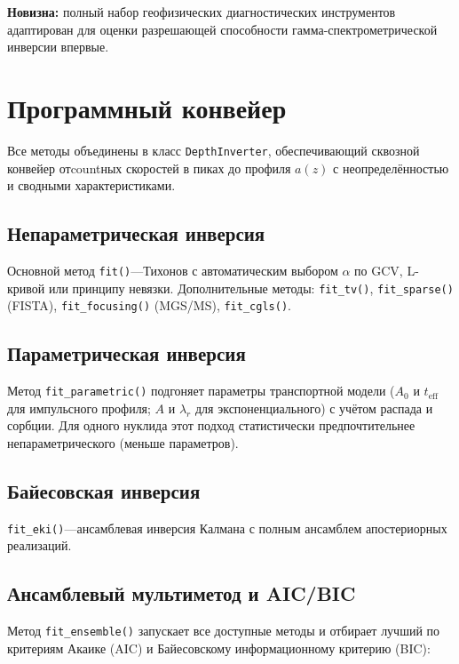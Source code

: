 \documentclass[12pt,a4paper]{article}
\begin{document}
\textbf{Новизна:} полный набор геофизических диагностических
инструментов адаптирован для оценки разрешающей способности
гамма-спектрометрической инверсии впервые.



\section{Программный конвейер}
\label{sec:pipeline}

Все методы объединены в класс \texttt{DepthInverter}, обеспечивающий
сквозной конвейер отcountных скоростей в пиках до профиля $a(z)$
с неопределённостью и сводными характеристиками.

\subsection{Непараметрическая инверсия}

Основной метод \texttt{fit()}---Тихонов с автоматическим выбором $\alpha$
по GCV, L-кривой или принципу невязки.
Дополнительные методы: \texttt{fit\_tv()}, \texttt{fit\_sparse()} (FISTA),
\texttt{fit\_focusing()} (MGS/MS), \texttt{fit\_cgls()}.

\subsection{Параметрическая инверсия}

Метод \texttt{fit\_parametric()} подгоняет параметры транспортной модели
($A_0$ и $t_{\mathrm{eff}}$ для импульсного профиля;
$A$ и $\lambda_r$ для экспоненциального) с учётом
распада и сорбции.
Для одного нуклида этот подход статистически предпочтительнее
непараметрического (меньше параметров).

\subsection{Байесовская инверсия}

\texttt{fit\_eki()}---ансамблевая инверсия Калмана с
полным ансамблем апостериорных реализаций.

\subsection{Ансамблевый мультиметод и AIC/BIC}
\label{sub:ensemble}

Метод \texttt{fit\_ensemble()} запускает все доступные методы
и отбирает лучший по критериям Акаике (AIC) и Байесовскому
информационному критерию (BIC):
\end{document}
